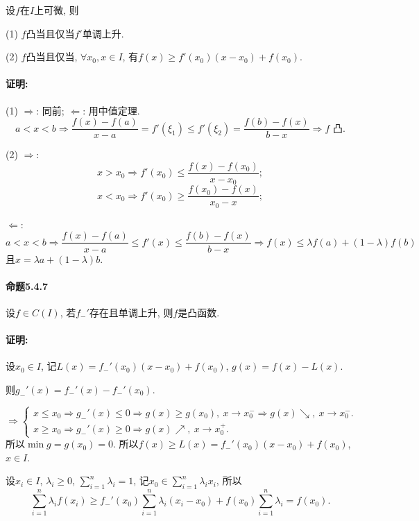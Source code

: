 设$f$在$I$上可微, 则

(1) $f$凸当且仅当$f'$单调上升.

(2) $f$凸当且仅当, $\forall x_{0},x\in I$, 有$f(x)\ge f'(x_{0})(x-x_{0})+f(x_{0})$. 

\paragraph{证明:}

(1) $\Longrightarrow$: 同前; $\Longleftarrow$: 用中值定理.
\[
a<x<b\Longrightarrow\frac{f(x)-f(a)}{x-a}=f'(\xi_{1})\le f'(\xi_{2})=\frac{f(b)-f(x)}{b-x}\Longrightarrow f\text{ 凸.}
\]

(2) $\Longrightarrow$: 
\[
x>x_{0}\Longrightarrow f'(x_{0})\le\frac{f(x)-f(x_{0})}{x-x_{0}};
\]
\[
x<x_{0}\Longrightarrow f'(x_{0})\ge\frac{f(x_{0})-f(x)}{x_{0}-x};
\]

$\Longleftarrow$: 
\[
a<x<b\Longrightarrow\frac{f(x)-f(a)}{x-a}\le f'(x)\le\frac{f(b)-f(x)}{b-x}\Longrightarrow f(x)\le\lambda f(a)+(1-\lambda)f(b)
\]
且$x=\lambda a+(1-\lambda)b$.

\paragraph{命题5.4.7}

设$f\in C(I)$, 若$f_{-}'$存在且单调上升, 则$f$是凸函数.

\paragraph{证明:}

设$x_{0}\in I$, 记$L(x)=f_{-}'(x_{0})(x-x_{0})+f(x_{0})$, $g(x)=f(x)-L(x)$.

则$g_{-}'(x)=f_{-}'(x)-f_{-}'(x_{0})$.

\[
\Longrightarrow\begin{cases}
x\le x_{0}\Longrightarrow g_{-}'(x)\le0\Longrightarrow g(x)\ge g(x_{0}),\ x\to x_{0}^{-}\Longrightarrow g(x)\searrow,\ x\to x_{0}^{-}.\\
x\ge x_{0}\Longrightarrow g_{-}'(x)\ge0\Longrightarrow g(x)\nearrow,\ x\to x_{0}^{+}.
\end{cases}
\]
所以$\min g=g(x_{0})=0$. 所以$f(x)\ge L(x)=f_{-}'(x_{0})(x-x_{0})+f(x_{0})$,
$x\in I$.

设$x_{i}\in I$, $\lambda_{i}\ge0$, $\sum_{i=1}^{n}\lambda_{i}=1$,
记$x_{0}\in\sum_{i=1}^{n}\lambda_{i}x_{i}$, 所以
\[
\sum_{i=1}^{n}\lambda_{i}f(x_{i})\ge f_{-}'(x_{0})\sum_{i=1}^{n}\lambda_{i}(x_{i}-x_{0})+f(x_{0})\sum_{i=1}^{n}\lambda_{i}=f(x_{0}).
\]


